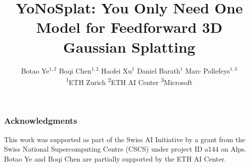 \documentclass{article} %
\title{YoNoSplat: You Only Need One Model for Feedforward 3D Gaussian Splatting}
\author{Botao Ye$^{1,2}$ \quad Boqi Chen$^{1,2}$ \quad Haofei Xu$^{1}$ \quad Daniel Barath$^1$ \quad Marc Pollefeys$^{1,3}$ \\[4pt]
	\textsuperscript{1}ETH Zurich \quad \textsuperscript{2}ETH AI Center \quad \textsuperscript{3}Microsoft\\[4pt]
}
\begin{document}
\maketitle









\subsubsection*{Acknowledgments}
This work was supported as part of the Swiss AI Initiative by a grant from the Swiss National Supercomputing Centre (CSCS) under project ID a144 on Alps.
Botao Ye and Boqi Chen are partially supported by the ETH AI Center.




\appendix
\newpage

\end{document}
